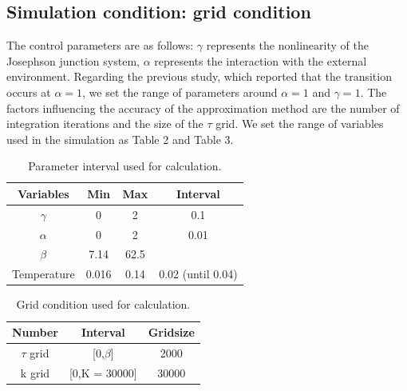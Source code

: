 \documentclass{article}[12pt]
\begin{document}
\begin{spacing}{1.5}
\subsection{Simulation condition: grid condition}
The control parameters are as follows: $\gamma$ represents the nonlinearity of the Josephson junction system, 
$\alpha$ represents the interaction with the external environment. Regarding the previous study, which reported 
that the transition occurs at $\alpha = 1$, we set the range of parameters around $\alpha = 1$ and $\gamma = 1$. 
The factors influencing the accuracy of the approximation method are the number of integration iterations and the size of the $\tau$ grid. 
We set the range of variables used in the simulation as Table 2 and Table 3.
\begin{table}[htbp]
  \centering
  \renewcommand{\arraystretch}{1.2}  %
  \begin{tabular}{@{}cccc@{}}
  \toprule
  \textbf{Variables} & \textbf{Min} & \textbf{Max}  & \textbf{Interval}\\ 
  \midrule
  $\gamma$ & 0 & 2 & 0.1 \\
  $\alpha$ & 0 & 2 & 0.01 \\
  $\beta$ & 7.14 & 62.5 &  \\
  Temperature & 0.016 & 0.14 & 0.02 (until 0.04) \\
  \bottomrule
  \end{tabular}
  \caption{Parameter interval used for calculation.}
  \end{table}
\begin{table}[htbp]
  \centering
  \renewcommand{\arraystretch}{1.2}  %
  \begin{tabular}{@{}ccc@{}}
  \toprule
  \textbf{Number} & \textbf{Interval} & \textbf{Gridsize}\\ 
  \midrule
  $\tau$ grid & [0,$\beta$] & 2000 \\
  k grid & [0,K = 30000] & 30000 \\
  \bottomrule
  \end{tabular}
  \caption{Grid condition used for calculation.}
  \end{table}

\end{spacing}
\end{document}
